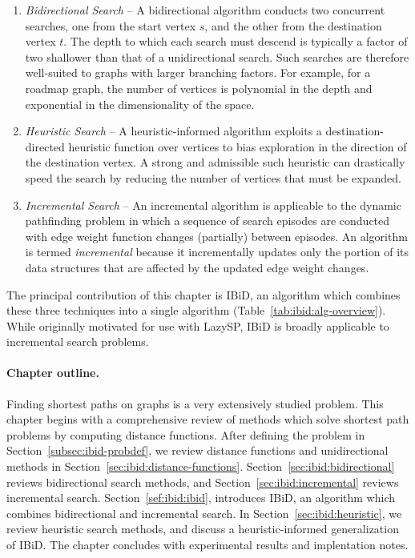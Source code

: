 \begin{enumerate}
\item \emph{Bidirectional Search} -- A bidirectional algorithm
   conducts two concurrent searches,
   one from the start vertex $s$,
   and the other from the destination vertex $t$.
   The depth to which each search must descend is typically
   a factor of two shallower than that of a unidirectional search.
   Such searches are therefore well-suited to graphs with larger
   branching factors.
   For example,
   for a roadmap graph,
   the number of vertices is polynomial in the depth
   and exponential in the dimensionality of the space.
\item \emph{Heuristic Search} -- A heuristic-informed algorithm
   exploits a destination-directed heuristic function over vertices to bias
   exploration in the direction of the destination vertex.
   A strong and admissible such heuristic can drastically speed the
   search by reducing the number of vertices that must be expanded.
\item \emph{Incremental Search} -- An incremental algorithm
   is applicable to the dynamic pathfinding problem in which
   a sequence of search episodes are conducted with
   edge weight function changes (partially) between episodes.
   An algorithm is termed \emph{incremental} because
   it incrementally updates only the portion of its data structures
   that are affected by the updated edge weight changes.
\end{enumerate}

The principal contribution of this chapter is IBiD,
an algorithm which combines these three techniques into a single
algorithm
(Table~\ref{tab:ibid:alg-overview}).
While originally motivated for use with LazySP,
IBiD is broadly applicable to incremental search problems.

\paragraph{Chapter outline.}
Finding shortest paths on graphs is a very extensively studied problem.
This chapter begins with a comprehensive review of 
methods which solve shortest path problems by computing
distance functions.
After defining the problem in Section~\ref{subsec:ibid-probdef},
we review distance functions and unidirectional methods
in Section~\ref{sec:ibid:distance-functions}.
Section~\ref{sec:ibid:bidirectional} reviews
bidirectional search methods,
and Section~\ref{sec:ibid:incremental} reviews incremental search.
Section~\ref{sef:ibid:ibid}, introduces IBiD,
an algorithm which combines bidirectional and incremental search.
In Section~\ref{sec:ibid:heuristic},
we review heuristic search methods,
and discuss a heuristic-informed generalization of IBiD.
The chapter concludes with experimental results and implentation notes.

